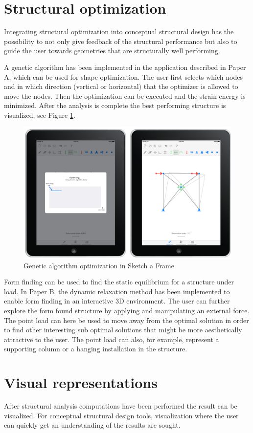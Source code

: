 \section{Structural optimization}
Integrating structural optimization into conceptual structural design has the possibility to not only give feedback of the structural performance but also to guide the user towards geometries that are structurally well performing. 

A genetic algorithm has been implemented in the application described in Paper A, which can be used for shape optimization. The user first selects which nodes and in which direction (vertical or horizontal) that the optimizer is allowed to move the nodes. Then the optimization can be executed and the strain energy is minimized. After the analysis is complete the best performing structure is visualized, see Figure \ref{fig:ipad-ga}. 

\begin{figure}
  \includegraphics[width=330pt]{graphics/ipad-ga.png}
  \caption{Genetic algorithm optimization in Sketch a Frame}
  \label{fig:ipad-ga}
\end{figure}

Form finding can be used to find the static equilibrium for a structure under load. In Paper B, the dynamic relaxation method has been implemented to enable form finding in an interactive 3D environment. The user can further explore the form found structure by applying and manipulating an external force. The point load can here be used to move away from the optimal solution in order to find other interesting sub optimal solutions that might be more aesthetically attractive to the user. The point load can also, for example, represent a supporting column or a hanging installation in the structure.


\section{Visual representations}
After structural analysis computations have been performed the result can be visualized. For conceptual structural design tools, visualization where the user can quickly get an understanding of the results are sought. 

